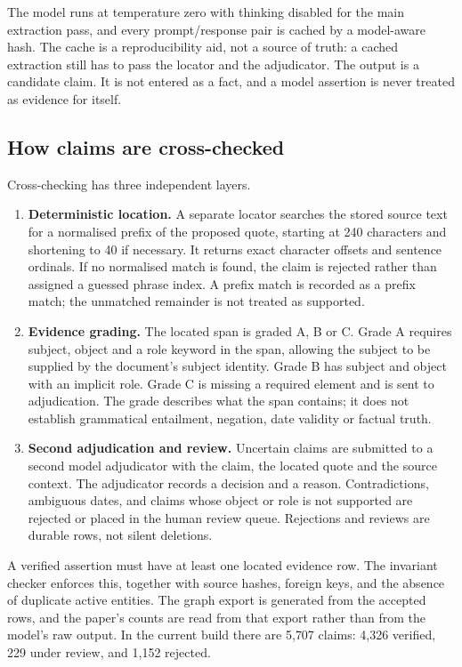 \documentclass[11pt,a4paper]{article}
\begin{document}
The model runs at temperature zero with thinking disabled for the main extraction pass, and every prompt/response pair is cached by a model-aware hash. The cache is a reproducibility aid, not a source of truth: a cached extraction still has to pass the locator and the adjudicator. The output is a candidate claim. It is not entered as a fact, and a model assertion is never treated as evidence for itself.

\subsection{How claims are cross-checked}

Cross-checking has three independent layers.

\begin{enumerate}
\item \textbf{Deterministic location.} A separate locator searches the stored source text for a normalised prefix of the proposed quote, starting at 240 characters and shortening to 40 if necessary. It returns exact character offsets and sentence ordinals. If no normalised match is found, the claim is rejected rather than assigned a guessed phrase index. A prefix match is recorded as a prefix match; the unmatched remainder is not treated as supported.
\item \textbf{Evidence grading.} The located span is graded A, B or C. Grade A requires subject, object and a role keyword in the span, allowing the subject to be supplied by the document's subject identity. Grade B has subject and object with an implicit role. Grade C is missing a required element and is sent to adjudication. The grade describes what the span contains; it does not establish grammatical entailment, negation, date validity or factual truth.
\item \textbf{Second adjudication and review.} Uncertain claims are submitted to a second model adjudicator with the claim, the located quote and the source context. The adjudicator records a decision and a reason. Contradictions, ambiguous dates, and claims whose object or role is not supported are rejected or placed in the human review queue. Rejections and reviews are durable rows, not silent deletions.
\end{enumerate}

A verified assertion must have at least one located evidence row. The invariant checker enforces this, together with source hashes, foreign keys, and the absence of duplicate active entities. The graph export is generated from the accepted rows, and the paper's counts are read from that export rather than from the model's raw output. In the current build there are 5{,}707 claims: 4{,}326 verified, 229 under review, and 1{,}152 rejected.
\end{document}
